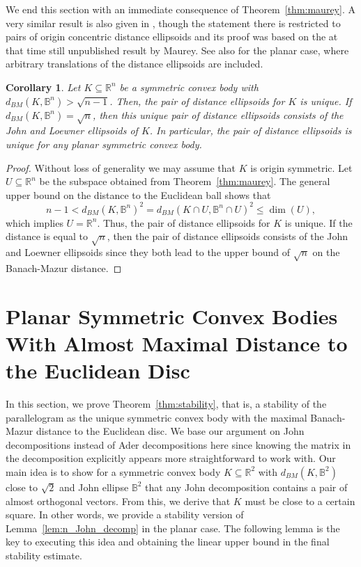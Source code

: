 \documentclass[12pt,a4paper]{article}
\newtheorem{cor}[twr]{Corollary}
\theoremstyle{definition}
\newcommand\R{\mathbb{R}}
\newcommand\B{\mathbb{B}}
\begin{document}
We end this section with an immediate consequence of Theorem~\ref{thm:maurey}. A very similar result is also given in \cite[Corollary~$3.2$]{praetorius}, though the statement there is restricted to pairs of origin concentric distance ellipsoids and its proof was based on the at that time still unpublished result by Maurey. See also \cite[Satz~$5$]{behrend} for the planar case, where arbitrary translations of the distance ellipsoids are included.



\begin{cor}
\label{cor:unique}
Let $K \subseteq \R^n$ be a symmetric convex body with $d_{BM}(K,\B^n) > \sqrt{n-1}$. Then, the pair of distance ellipsoids for $K$ is unique. If $d_{BM}(K,\B^n) = \sqrt{n}$, then this unique pair of distance ellipsoids consists of the John and Loewner ellipsoids of $K$. In particular, the pair of distance ellipsoids is unique for any planar symmetric convex body.
\end{cor}

\begin{proof}
Without loss of generality we may assume that $K$ is origin symmetric. Let $U \subseteq \R^n$ be the subspace obtained from Theorem~\ref{thm:maurey}. The general upper bound on the distance to the Euclidean ball shows that
$$ n-1 < d_{BM}(K,\B^n)^2 = d_{BM}(K \cap U, \B^n \cap U)^2 \leq \dim(U), $$
which implies $U = \R^n$. Thus, the pair of distance ellipsoids for $K$ is unique. If the distance is equal to $\sqrt{n}$, then the pair of distance ellipsoids consists of the John and Loewner ellipsoids since they both lead to the upper bound of $\sqrt{n}$ on the Banach-Mazur distance.
\end{proof}





\section{Planar Symmetric Convex Bodies With Almost Maximal Distance to the Euclidean Disc}
\label{sec:2d}



In this section, we prove Theorem~\ref{thm:stability}, that is, a stability of the parallelogram as the unique symmetric convex body with the maximal Banach-Mazur distance to the Euclidean disc. We base our argument on John decompositions instead of Ader decompositions here since knowing the matrix in the decomposition explicitly appears more straightforward to work with. Our main idea is to show for a symmetric convex body $K \subseteq \R^2$ with $d_{BM}(K,\B^2)$ close to $\sqrt{2}$ and John ellipse $\B^2$ that any John decomposition contains a pair of almost orthogonal vectors. From this, we derive that $K$ must be close to a certain square. In other words, we provide a stability version of Lemma~\ref{lem:n_John_decomp} in the planar case. The following lemma is the key to executing this idea and obtaining the linear upper bound in the final stability estimate.
\end{document}
